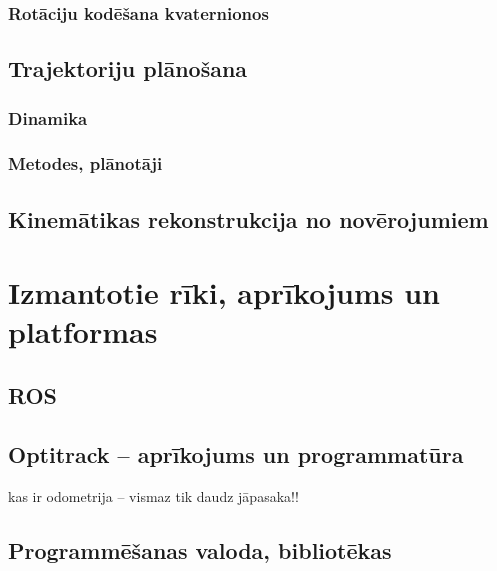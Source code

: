 \documentclass[12pt, a4paper]{article}
\numberwithin{equation}{section} %
\begin{document}
\subsubsection{Rotāciju kodēšana kvaternionos}

\subsection{Trajektoriju plānošana}

\subsubsection{Dinamika}

\subsubsection{Metodes, plānotāji}

\subsection{Kinemātikas rekonstrukcija no novērojumiem}


%
%
%
%
%
%
%
%
%
%
%
%
%
%
%
%
%
%
%

\newpage
\section{Izmantotie rīki, aprīkojums un platformas}

\subsection{ROS}

\subsection{Optitrack -- aprīkojums un programmatūra}

kas ir odometrija -- vismaz tik daudz jāpasaka!!

\subsection{Programmēšanas valoda, bibliotēkas}

%
%
%
%
%
%
%
%
%
%
%
%
%
%
%
%
%
%
%
\end{document}
